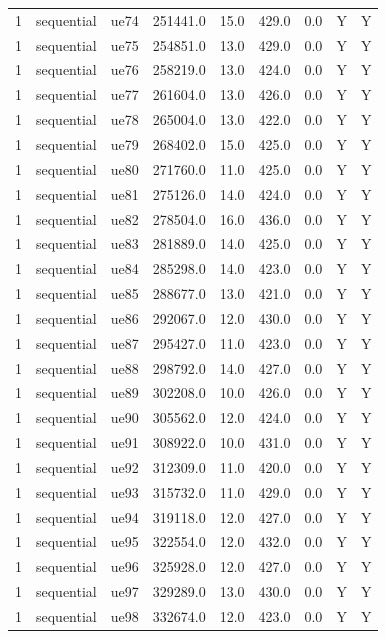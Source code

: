 \begin{table}[ht]
\begin{tabular}{|c|c|c|c|c|c|c|c|c|}
1 & sequential & ue74 & 251441.0 & 15.0 & 429.0 & 0.0 & Y & Y \\
1 & sequential & ue75 & 254851.0 & 13.0 & 429.0 & 0.0 & Y & Y \\
1 & sequential & ue76 & 258219.0 & 13.0 & 424.0 & 0.0 & Y & Y \\
1 & sequential & ue77 & 261604.0 & 13.0 & 426.0 & 0.0 & Y & Y \\
1 & sequential & ue78 & 265004.0 & 13.0 & 422.0 & 0.0 & Y & Y \\
1 & sequential & ue79 & 268402.0 & 15.0 & 425.0 & 0.0 & Y & Y \\
1 & sequential & ue80 & 271760.0 & 11.0 & 425.0 & 0.0 & Y & Y \\
1 & sequential & ue81 & 275126.0 & 14.0 & 424.0 & 0.0 & Y & Y \\
1 & sequential & ue82 & 278504.0 & 16.0 & 436.0 & 0.0 & Y & Y \\
1 & sequential & ue83 & 281889.0 & 14.0 & 425.0 & 0.0 & Y & Y \\
1 & sequential & ue84 & 285298.0 & 14.0 & 423.0 & 0.0 & Y & Y \\
1 & sequential & ue85 & 288677.0 & 13.0 & 421.0 & 0.0 & Y & Y \\
1 & sequential & ue86 & 292067.0 & 12.0 & 430.0 & 0.0 & Y & Y \\
1 & sequential & ue87 & 295427.0 & 11.0 & 423.0 & 0.0 & Y & Y \\
1 & sequential & ue88 & 298792.0 & 14.0 & 427.0 & 0.0 & Y & Y \\
1 & sequential & ue89 & 302208.0 & 10.0 & 426.0 & 0.0 & Y & Y \\
1 & sequential & ue90 & 305562.0 & 12.0 & 424.0 & 0.0 & Y & Y \\
1 & sequential & ue91 & 308922.0 & 10.0 & 431.0 & 0.0 & Y & Y \\
1 & sequential & ue92 & 312309.0 & 11.0 & 420.0 & 0.0 & Y & Y \\
1 & sequential & ue93 & 315732.0 & 11.0 & 429.0 & 0.0 & Y & Y \\
1 & sequential & ue94 & 319118.0 & 12.0 & 427.0 & 0.0 & Y & Y \\
1 & sequential & ue95 & 322554.0 & 12.0 & 432.0 & 0.0 & Y & Y \\
1 & sequential & ue96 & 325928.0 & 12.0 & 427.0 & 0.0 & Y & Y \\
1 & sequential & ue97 & 329289.0 & 13.0 & 430.0 & 0.0 & Y & Y \\
1 & sequential & ue98 & 332674.0 & 12.0 & 423.0 & 0.0 & Y & Y \\

\end{tabular}
\end{table}
